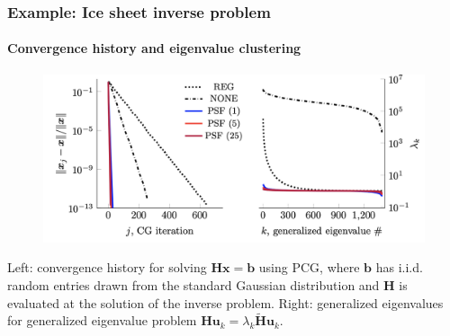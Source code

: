 \documentclass[10pt,final,xcolor=dvipsnames]{beamer}
\newcommand{\preconditioner}{\widetilde{H}}
\begin{document}
\begin{frame}
  \frametitle{Example: Ice sheet inverse problem}
  \framesubtitle{Convergence history and eigenvalue clustering}

  \begin{figure}
    \begin{center}
    \includegraphics[width=0.85\columnwidth]{extraplots/bbb}
    \end{center}
  \end{figure}
  \begin{center}
    Left: convergence history for solving $\mathbf{H} \mathbf{x} = \mathbf{b}$
    using PCG, where $\mathbf{b}$ has i.i.d. random entries drawn from the
    standard Gaussian distribution and $\mathbf{H}$ is evaluated at the
    solution of the inverse problem. Right: generalized eigenvalues
    for generalized eigenvalue problem $\mathbf{H} \mathbf{u}_{k}=\lambda_{k}
    \mathbf{\preconditioner} \mathbf{u}_{k}$.
  \end{center}
\end{frame}
\end{document}
